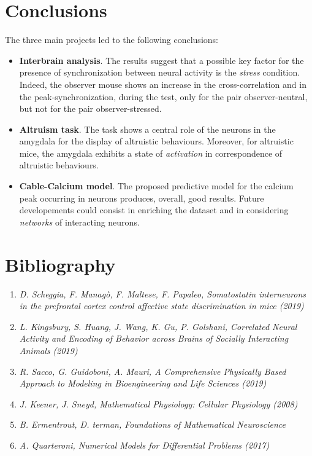 \documentclass[11pt,a4paper,twocolumn]{article}
\begin{document}
\section{Conclusions}

The three main projects led to the following conclusions:

\begin{itemize}
	\item \textbf{Interbrain analysis}. The results suggest that a possible key factor for the presence of synchronization between neural activity is the \textit{stress} condition. Indeed, the observer mouse shows an increase in the cross-correlation and in the peak-synchronization, during the test, only for the pair observer-neutral, but not for the pair observer-stressed.
	
	\item \textbf{Altruism task}. The task shows a central role of the neurons in the amygdala for the display of altruistic behaviours. Moreover, for altruistic mice,  the amygdala exhibits a state of \textit{activation} in correspondence of altruistic behaviours. 
	
	\item  \textbf{Cable-Calcium model}. The proposed predictive model for the calcium peak occurring in neurons produces, overall, good results. Future developements could consist in enriching the dataset and in considering \textit{networks} of interacting neurons.
\end{itemize}

\section{Bibliography}

\begin{enumerate}
	\item \textit{D. Scheggia, F. Managò, F. Maltese, F. Papaleo, Somatostatin interneurons in the prefrontal cortex
		control affective state discrimination in mice (2019)}
	
	\item \textit{L. Kingsbury, S. Huang, J. Wang,
		K. Gu, P. Golshani, Correlated Neural Activity and Encoding of Behavior
		across Brains of Socially Interacting Animals (2019)}
	
	\item \textit{R. Sacco, G. Guidoboni, A. Mauri, A Comprehensive Physically Based Approach to Modeling in Bioengineering and Life Sciences (2019)}
	
	\item \textit{J. Keener, J. Sneyd, Mathematical Physiology: Cellular Physiology (2008)}
	
	\item \textit{B. Ermentrout, D. terman, Foundations of
		Mathematical Neuroscience}
	
	\item \textit{A. Quarteroni, Numerical Models for Differential Problems (2017)}
\end{enumerate}
\end{document}
